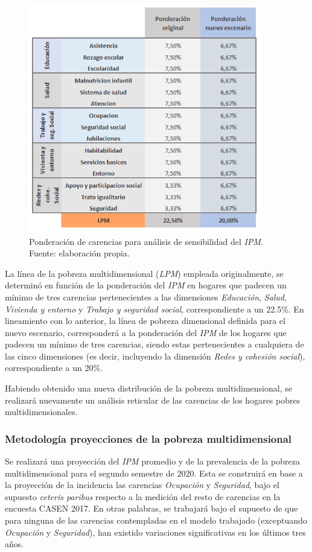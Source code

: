 \documentclass[12pt,letterpaper,spanish]{article}
\begin{document}
\begin{figure}[H]
    \centering
    \includegraphics[height=10cm]{Max/ponderaciones_sensib.png}
    \caption{Ponderación de carencias para análisis de sensibilidad del \textit{IPM}. Fuente: elaboración propia.}
    \label{ponddos}
\end{figure}

La línea de la pobreza multidimensional (\textit{LPM}) empleada originalmente, se determinó en función de la ponderación del \textit{IPM} en hogares que padecen un mínimo de tres carencias pertenecientes a las dimensiones \textit{Educación}, \textit{Salud}, \textit{Vivienda y entorno} y \textit{Trabajo y seguridad social}, correspondiente a un 22.5\%. En lineamiento con lo anterior, la línea de pobreza dimensional definida para el nuevo escenario, corresponderá a la ponderación del \textit{IPM} de los hogares que padecen un mínimo de tres carencias, siendo estas pertenecientes a cualquiera de las cinco dimensiones (es decir, incluyendo la dimensión \textit{Redes y cohesión social}), correspondiente a un 20\%. 

Habiendo obtenido una nueva distribución de la pobreza multidimensional, se realizará nuevamente un análisis reticular de las carencias de los hogares pobres multidimensionales.




\subsubsection{Metodología proyecciones de la pobreza multidimensional}
Se realizará una proyección del \textit{IPM} promedio y de la prevalencia de la pobreza multidimensional para el segundo semestre de 2020. Esta se construirá en base a la proyección de la incidencia las carencias \textit{Ocupación} y \textit{Seguridad}, bajo el supuesto \textit{ceteris paribus} respecto a la medición del resto de carencias en la encuesta CASEN 2017. En otras palabras, se trabajará bajo el supuesto de que para ninguna de las carencias contempladas en el modelo trabajado (exceptuando \textit{Ocupación} y \textit{Seguridad}), han existido variaciones significativas en los últimos tres años. 
\end{document}
